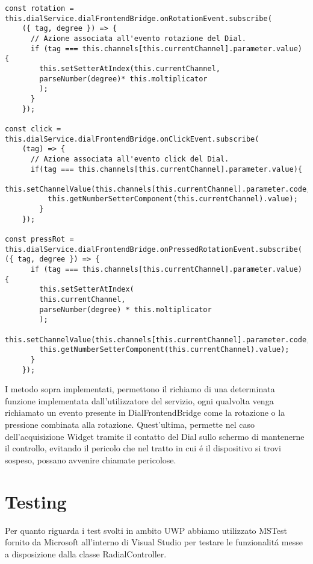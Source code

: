\vspace{1.0cm}
\begin{lstlisting}[caption={Ascolto eventi associati alla voce di menu' selezionata},style=javaScriptCode]
const rotation = this.dialService.dialFrontendBridge.onRotationEvent.subscribe(
	({ tag, degree }) => {
      // Azione associata all'evento rotazione del Dial.
      if (tag === this.channels[this.currentChannel].parameter.value) {
        this.setSetterAtIndex(this.currentChannel, 
        parseNumber(degree)* this.moltiplicator
        );
      }
    });

const click = this.dialService.dialFrontendBridge.onClickEvent.subscribe(
	(tag) => {
      // Azione associata all'evento click del Dial.
      if(tag === this.channels[this.currentChannel].parameter.value){
          this.setChannelValue(this.channels[this.currentChannel].parameter.code,
          this.getNumberSetterComponent(this.currentChannel).value);
        }
    });

const pressRot = this.dialService.dialFrontendBridge.onPressedRotationEvent.subscribe(
({ tag, degree }) => {
      if (tag === this.channels[this.currentChannel].parameter.value) {
        this.setSetterAtIndex(
        this.currentChannel, 
        parseNumber(degree) * this.moltiplicator
        );
        this.setChannelValue(this.channels[this.currentChannel].parameter.code,
        this.getNumberSetterComponent(this.currentChannel).value);
      }
    });
\end{lstlisting} 
\vspace{1.0cm}

I metodo sopra implementati, permettono il richiamo di una determinata funzione implementata dall'utilizzatore del servizio, ogni qualvolta venga richiamato un evento presente in DialFrontendBridge come la rotazione o la pressione combinata alla rotazione.
Quest'ultima, permette nel caso dell'acquisizione Widget tramite il contatto del Dial sullo schermo di mantenerne il controllo, evitando il pericolo che nel tratto in cui é il dispositivo si trovi sospeso, possano avvenire chiamate pericolose.

\section{Testing}

Per quanto riguarda i test svolti in ambito UWP abbiamo utilizzato MSTest fornito da Microsoft all’interno di Visual Studio per testare le funzionalitá messe a disposizione dalla classe RadialController.

